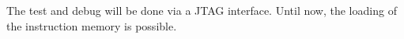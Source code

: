 The test and debug will be done via a JTAG interface. Until now, the loading of the instruction memory is possible.